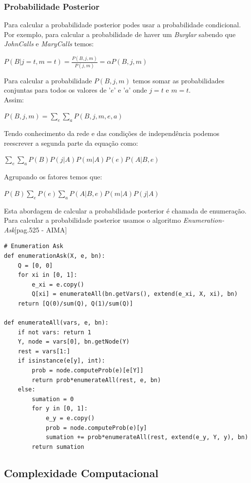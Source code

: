 \documentclass[9pt, a4paper, twocolumn]{article}
\begin{document}
\subsubsection{Probabilidade Posterior}
\hspace{10mm}Para calcular a probabilidade posterior podes usar a probabilidade condicional. Por exemplo, para calcular a probabilidade de haver um \textit{Burglar} sabendo que \textit{JohnCalls} e \textit{MaryCalls} temos:
\begin{center}
$P(B|j=t, m=t)=\displaystyle\frac{P(B,j,m)}{P(j,m)}=\alpha P(B,j,m)$
\end{center}
Para calcular a probabilidade $P(B, j, m)$ temos somar as probabilidades conjuntas para todos os valores de '$e$' e '$a$' onde $j=t$ e $m=t$.\\
Assim:
\begin{center}
$P(B, j, m) = \displaystyle\sum_{e}\sum_{a}P(B, j, m, e, a)$
\end{center}
Tendo conhecimento da rede e das condições de independência podemos reescrever a segunda parte da equação como:
\begin{center}
$\displaystyle\sum_{e}\sum_{a}P(B)P(j|A)P(m|A)P(e)P(A|B,e)$
\end{center}
Agrupando os fatores temos que:
\begin{center}
$P(B)\displaystyle\sum_{e}P(e)\displaystyle\sum_{a}P(A|B, e)P(m|A)P(j|A)$
\end{center}
Esta abordagem de calcular a probabilidade posterior é chamada de enumeração. Para calcular a probabilidade posterior usamos o algoritmo \emph{Enumeration-Ask}[pag.525 - AIMA]
\begin{lstlisting}
# Enumeration Ask
def enumerationAsk(X, e, bn):
	Q = [0, 0]
	for xi in [0, 1]:
		e_xi = e.copy()
		Q[xi] = enumerateAll(bn.getVars(), extend(e_xi, X, xi), bn)
	return [Q(0)/sum(Q), Q(1)/sum(Q)]
	
def enumerateAll(vars, e, bn):
	if not vars: return 1
	Y, node = vars[0], bn.getNode(Y)
	rest = vars[1:]
	if isinstance(e[y], int):
		prob = node.computeProb(e)[e[Y]]
		return prob*enumerateAll(rest, e, bn)
	else:
		sumation = 0
		for y in [0, 1]:
			e_y = e.copy()
			prob = node.computeProb(e)[y]
			sumation += prob*enumerateAll(rest, extend(e_y, Y, y), bn)
		return sumation
\end{lstlisting}
\subsection{Complexidade Computacional}
\end{document}
